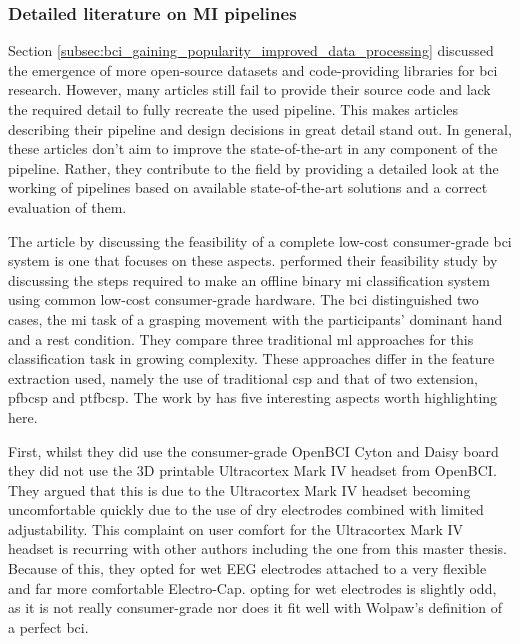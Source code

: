 
\subsubsection{Detailed literature on MI pipelines}
\label{subsubsec:bci_opportunities_obstacles_motivating_examples_mi_pipeline}

Section \ref{subsec:bci_gaining_popularity_improved_data_processing} discussed the emergence of more open-source datasets and code-providing libraries for \gls{bci} research.
However, many articles still fail to provide their source code and lack the required detail to fully recreate the used pipeline.
This makes articles describing their pipeline and design decisions in great detail stand out.
In general, these articles don't aim to improve the state-of-the-art in any component of the pipeline.
Rather, they contribute to the field by providing a detailed look at the working of pipelines based on available state-of-the-art solutions and a correct evaluation of them.

The article by \citet{cheap_bci_feasibility} discussing the feasibility of a complete low-cost consumer-grade \gls{bci} system is one that focuses on these aspects.
 performed their feasibility study by discussing the steps required to make an offline binary \gls{mi} classification system using common low-cost consumer-grade hardware.
The \gls{bci} distinguished two cases, the \gls{mi} task of a grasping movement with the participants' dominant hand and a rest condition.
They compare three traditional \gls{ml} approaches for this classification task in growing complexity.
These approaches differ in the feature extraction used, namely the use of traditional \gls{csp} and that of two extension, \gls{pfbcsp} and \gls{ptfbcsp}.
The work by \citet{cheap_bci_feasibility} has five interesting aspects worth highlighting here.

First, whilst they did use the consumer-grade OpenBCI Cyton and Daisy board they did not use the 3D printable Ultracortex Mark IV headset from OpenBCI.
They argued that this is due to the Ultracortex Mark IV headset becoming uncomfortable quickly due to the use of dry electrodes combined with limited adjustability.
This complaint on user comfort for the Ultracortex Mark IV headset is recurring with other authors including the one from this master thesis.
Because of this, they opted for wet EEG electrodes attached to a very flexible and far more comfortable Electro-Cap.
 opting for wet electrodes is slightly odd, as it is not really consumer-grade nor does it fit well with Wolpaw's definition of a perfect \gls{bci}.

